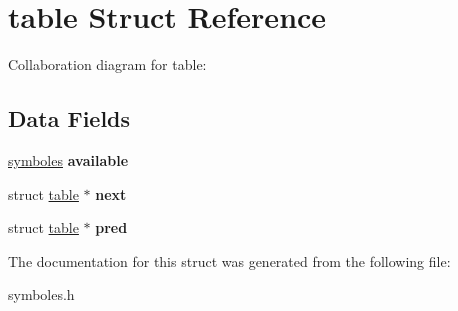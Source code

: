\hypertarget{structtable}{}\section{table Struct Reference}
\label{structtable}


Collaboration diagram for table\+:
\subsection*{Data Fields}
\begin{DoxyCompactItemize}
\item 
\mbox{\label{structtable_a80961c17ba87798109cceb2b8093cbce}} 
\hyperlink{structsymboles}{symboles} {\bfseries available}
\item 
\mbox{\label{structtable_a7bc2383dcc3fea97f50e481d6ff27111}} 
struct \hyperlink{structtable}{table} $\ast$ {\bfseries next}
\item 
\mbox{\label{structtable_a5f664accb3b3846af030fb5ae6dcc493}} 
struct \hyperlink{structtable}{table} $\ast$ {\bfseries pred}
\end{DoxyCompactItemize}


The documentation for this struct was generated from the following file\+:\begin{DoxyCompactItemize}
\item 
symboles.\+h\end{DoxyCompactItemize}
